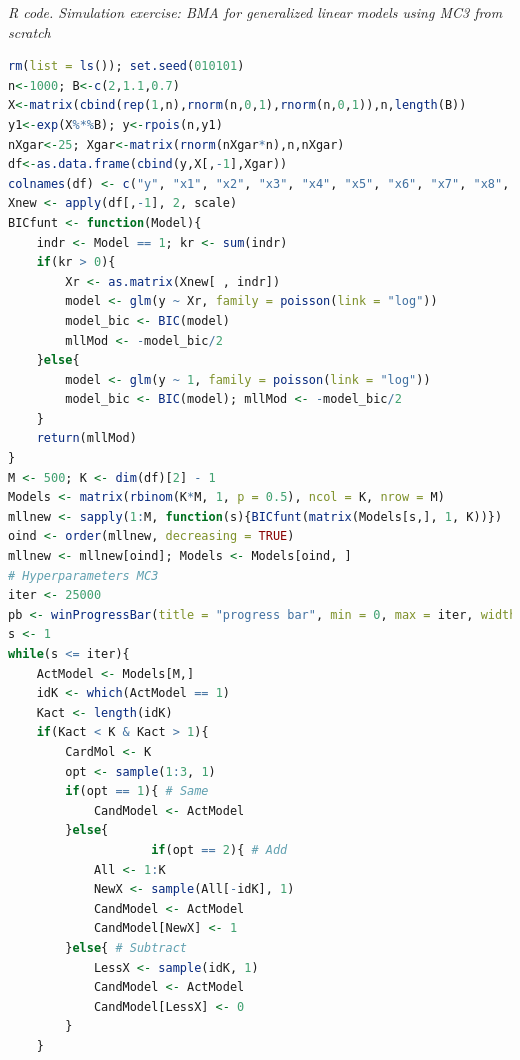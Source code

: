 \begin{tcolorbox}[enhanced,width=4.67in,center upper,
	fontupper=\large\bfseries,drop shadow southwest,sharp corners]
	\textit{R code. Simulation exercise: BMA for generalized linear models using MC3 from scratch}
	\begin{VF}
		\begin{lstlisting}[language=R]
rm(list = ls()); set.seed(010101)
n<-1000; B<-c(2,1.1,0.7)
X<-matrix(cbind(rep(1,n),rnorm(n,0,1),rnorm(n,0,1)),n,length(B))
y1<-exp(X%*%B); y<-rpois(n,y1)
nXgar<-25; Xgar<-matrix(rnorm(nXgar*n),n,nXgar)
df<-as.data.frame(cbind(y,X[,-1],Xgar))
colnames(df) <- c("y", "x1", "x2", "x3", "x4", "x5", "x6", "x7", "x8", "x9", "x10", "x11", "x12", "x13", "x14", "x15", "x16", "x17", "x18", "x19", "x20", "x21", "x22", "x23", "x24", "x25", "x26", "x27")
Xnew <- apply(df[,-1], 2, scale)
BICfunt <- function(Model){
	indr <- Model == 1; kr <- sum(indr)
	if(kr > 0){
		Xr <- as.matrix(Xnew[ , indr])
		model <- glm(y ~ Xr, family = poisson(link = "log"))
		model_bic <- BIC(model)
		mllMod <- -model_bic/2
	}else{
		model <- glm(y ~ 1, family = poisson(link = "log"))
		model_bic <- BIC(model); mllMod <- -model_bic/2
	}
	return(mllMod)
}
M <- 500; K <- dim(df)[2] - 1
Models <- matrix(rbinom(K*M, 1, p = 0.5), ncol = K, nrow = M)
mllnew <- sapply(1:M, function(s){BICfunt(matrix(Models[s,], 1, K))})
oind <- order(mllnew, decreasing = TRUE)
mllnew <- mllnew[oind]; Models <- Models[oind, ]
# Hyperparameters MC3
iter <- 25000
pb <- winProgressBar(title = "progress bar", min = 0, max = iter, width = 300)
s <- 1
while(s <= iter){
	ActModel <- Models[M,]
	idK <- which(ActModel == 1)
	Kact <- length(idK)
	if(Kact < K & Kact > 1){
		CardMol <- K
		opt <- sample(1:3, 1)
		if(opt == 1){ # Same
			CandModel <- ActModel
		}else{
					if(opt == 2){ # Add
			All <- 1:K
			NewX <- sample(All[-idK], 1)
			CandModel <- ActModel
			CandModel[NewX] <- 1
		}else{ # Subtract
			LessX <- sample(idK, 1)
			CandModel <- ActModel
			CandModel[LessX] <- 0
		}
	}
\end{lstlisting}
	\end{VF}
\end{tcolorbox} 

